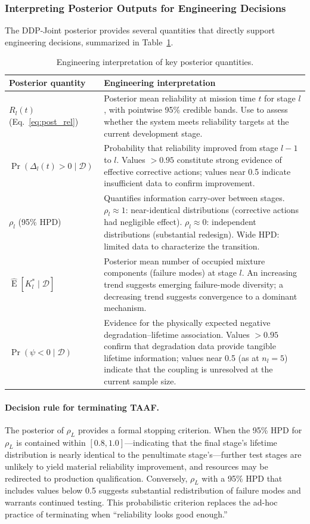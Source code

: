 \documentclass[a4paper,fleqn,longmktitle]{cas-sc}
\DeclareMathOperator{\E}{E}
\begin{document}
\subsubsection{Interpreting Posterior Outputs for Engineering Decisions}

The DDP-Joint posterior provides several quantities that directly support engineering decisions, summarized in Table~\ref{tab:engineering_outputs}.

\begin{table}[h]
\centering
\caption{Engineering interpretation of key posterior quantities.}
\label{tab:engineering_outputs}
\begin{tabular}{lp{}}
\toprule
Posterior quantity & Engineering interpretation \\
\midrule
$R_l(t)$ (Eq.~\ref{eq:post_rel}) & Posterior mean reliability at mission time $t$ for stage $l$, with pointwise 95\% credible bands. Use to assess whether the system meets reliability targets at the current development stage. \\
$\Pr(\Delta_l(t) > 0 \mid \mathcal{D})$ & Probability that reliability improved from stage $l-1$ to $l$. Values $>0.95$ constitute strong evidence of effective corrective actions; values near 0.5 indicate insufficient data to confirm improvement. \\
$\rho_l$ (95\% HPD) & Quantifies information carry-over between stages. $\rho_l \approx 1$: near-identical distributions (corrective actions had negligible effect). $\rho_l \approx 0$: independent distributions (substantial redesign). Wide HPD: limited data to characterize the transition. \\
$\widehat{\E}[K^*_l \mid \mathcal{D}]$ & Posterior mean number of occupied mixture components (failure modes) at stage $l$. An increasing trend suggests emerging failure-mode diversity; a decreasing trend suggests convergence to a dominant mechanism. \\
$\Pr(\psi < 0 \mid \mathcal{D})$ & Evidence for the physically expected negative degradation--lifetime association. Values $>0.95$ confirm that degradation data provide tangible lifetime information; values near 0.5 (as at $n_l=5$) indicate that the coupling is unresolved at the current sample size. \\
\bottomrule
\end{tabular}
\end{table}

\paragraph{Decision rule for terminating TAAF.} The posterior of $\rho_L$ provides a formal stopping criterion. When the 95\% HPD for $\rho_L$ is contained within $[0.8, 1.0]$---indicating that the final stage's lifetime distribution is nearly identical to the penultimate stage's---further test stages are unlikely to yield material reliability improvement, and resources may be redirected to production qualification. Conversely, $\rho_L$ with a 95\% HPD that includes values below 0.5 suggests substantial redistribution of failure modes and warrants continued testing. This probabilistic criterion replaces the ad-hoc practice of terminating when ``reliability looks good enough.''
\end{document}
